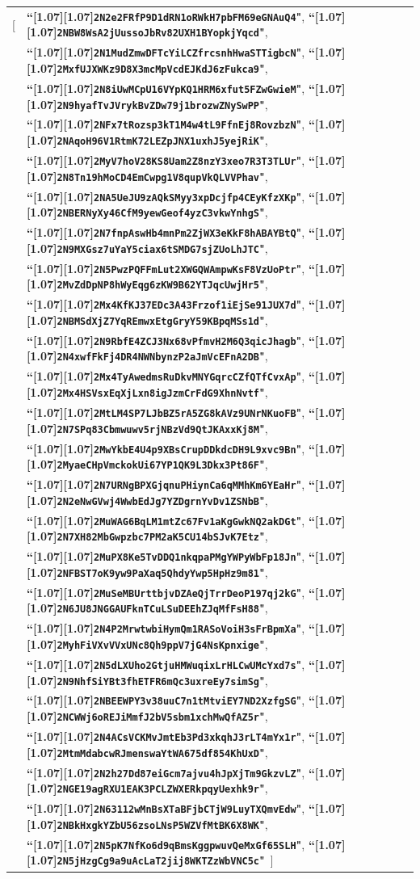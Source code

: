 \documentclass{article}
\let\oldtexttt\texttt
\renewcommand{\texttt}[1]{\scalebox{1.02}[1.07]{\oldtexttt{#1}}}
\newcommand{\ascii}[1]{\textbf{``\texttt{#1}"}}
\begin{document}
\begin{tabular}{@{\hskip 2.5em}l@{\;}l}
[& \ascii{2N2e2FRfP9D1dRN1oRWkH7pbFM69eGNAuQ4}, \ascii{2NBW8WsA2jUussoJbRv82UXH1BYopkjYqcd}, \\
 & \ascii{2N1MudZmwDFTcYiLCZfrcsnhHwaSTTigbcN}, \ascii{2MxfUJXWKz9D8X3mcMpVcdEJKdJ6zFukca9}, \\
 & \ascii{2N8iUwMCpU16VYpKQ1HRM6xfut5FZwGwieM}, \ascii{2N9hyafTvJVrykBvZDw79j1brozwZNySwPP}, \\
 & \ascii{2NFx7tRozsp3kT1M4w4tL9FfnEj8RovzbzN}, \ascii{2NAqoH96V1RtmK72LEZpJNX1uxhJ5yejRiK}, \\
 & \ascii{2MyV7hoV28KS8Uam2Z8nzY3xeo7R3T3TLUr}, \ascii{2N8Tn19hMoCD4EmCwpg1V8qupVkQLVVPhav}, \\
 & \ascii{2NA5UeJU9zAQkSMyy3xpDcjfp4CEyKfzXKp}, \ascii{2NBERNyXy46CfM9yewGeof4yzC3vkwYnhgS}, \\
 & \ascii{2N7fnpAswHb4mnPm2ZjWX3eKkF8hABAYBtQ}, \ascii{2N9MXGsz7uYaY5ciax6tSMDG7sjZUoLhJTC}, \\
 & \ascii{2N5PwzPQFFmLut2XWGQWAmpwKsF8VzUoPtr}, \ascii{2MvZdDpNP8hWyEqg6zKW9B62YTJqcUwjHr5}, \\
 & \ascii{2Mx4KfKJ37EDc3A43Frzof1iEjSe91JUX7d}, \ascii{2NBMSdXjZ7YqREmwxEtgGryY59KBpqMSs1d}, \\
 & \ascii{2N9RbfE4ZCJ3Nx68vPfmvH2M6Q3qicJhagb}, \ascii{2N4xwfFkFj4DR4NWNbynzP2aJmVcEFnA2DB}, \\
 & \ascii{2Mx4TyAwedmsRuDkvMNYGqrcCZfQTfCvxAp}, \ascii{2Mx4HSVsxEqXjLxn8igJzmCrFdG9XhnNvtf}, \\
 & \ascii{2MtLM4SP7LJbBZ5rA5ZG8kAVz9UNrNKuoFB}, \ascii{2N7SPq83Cbmwuwv5rjNBzVd9QtJKAxxKj8M}, \\
 & \ascii{2MwYkbE4U4p9XBsCrupDDkdcDH9L9xvc9Bn}, \ascii{2MyaeCHpVmckokUi67YP1QK9L3Dkx3Pt86F}, \\
 & \ascii{2N7URNgBPXGjqnuPHiynCa6qMMhKm6YEaHr}, \ascii{2N2eNwGVwj4WwbEdJg7YZDgrnYvDv1ZSNbB}, \\
 & \ascii{2MuWAG6BqLM1mtZc67Fv1aKgGwkNQ2akDGt}, \ascii{2N7XH82MbGwpzbc7PM2aK5CU14bSJvK7Etz}, \\
 & \ascii{2MuPX8Ke5TvDDQ1nkqpaPMgYWPyWbFp18Jn}, \ascii{2NFBST7oK9yw9PaXaq5QhdyYwp5HpHz9m81}, \\
 & \ascii{2MuSeMBUrttbjvDZAeQjTrrDeoP197qj2kG}, \ascii{2N6JU8JNGGAUFknTCuLSuDEEhZJqMfFsH88}, \\
 & \ascii{2N4P2MrwtwbiHymQm1RASoVoiH3sFrBpmXa}, \ascii{2MyhFiVXvVVxUNc8Qh9ppV7jG4NsKpnxige}, \\
 & \ascii{2N5dLXUho2GtjuHMWuqixLrHLCwUMcYxd7s}, \ascii{2N9NhfSiYBt3fhETFR6mQc3uxreEy7simSg}, \\
 & \ascii{2NBEEWPY3v38uuC7n1tMtviEY7ND2XzfgSG}, \ascii{2NCWWj6oREJiMmfJ2bV5sbm1xchMwQfAZ5r}, \\
 & \ascii{2N4ACsVCKMvJmtEb3Pd3xkqhJ3rLT4mYx1r}, \ascii{2MtmMdabcwRJmenswaYtWA675df854KhUxD}, \\
 & \ascii{2N2h27Dd87eiGcm7ajvu4hJpXjTm9GkzvLZ}, \ascii{2NGE19agRXU1EAK3PCLZWXERkpqyUexhk9r}, \\
 & \ascii{2N63112wMnBsXTaBFjbCTjW9LuyTXQmvEdw}, \ascii{2NBkHxgkYZbU56zsoLNsP5WZVfMtBK6X8WK}, \\
 & \ascii{2N5pK7NfKo6d9qBmsKggpwuvQeMxGf65SLH}, \ascii{2N5jHzgCg9a9uAcLaT2jij8WKTZzWbVNC5c}\, ]
\end{tabular}
\end{document}
